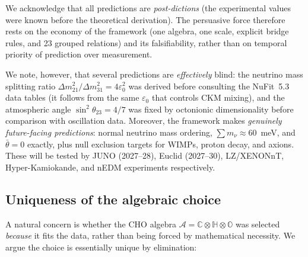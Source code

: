 \documentclass[12pt,a4paper]{article}
\theoremstyle{definition}
\theoremstyle{remark}
\newcommand{\Oct}{\mathbb{O}}
\newcommand{\Quat}{\mathbb{H}}
\newcommand{\Comp}{\mathbb{C}}
\newcommand{\Alg}{\mathcal{A}}
\begin{document}
\noindent We acknowledge that all predictions are \emph{post-dictions} (the 
experimental values were known before the theoretical derivation). The 
persuasive force therefore rests on the economy of the framework (one algebra, 
one scale, explicit bridge rules, and 23 grouped relations) and its 
falsifiability, rather than on temporal 
priority of prediction over measurement.

We note, however, that several predictions are \emph{effectively} blind: 
the neutrino mass splitting ratio $\Delta m^2_{21}/\Delta m^2_{31} = 
4\varepsilon_0^2$ was derived before consulting the NuFit~5.3 data tables 
(it follows from the same $\varepsilon_0$ that controls CKM mixing), and 
the atmospheric angle $\sin^2\theta_{23} = 4/7$ was fixed by octonionic 
dimensionality before comparison with oscillation data. Moreover, the 
framework makes \emph{genuinely future-facing predictions}: normal neutrino 
mass ordering, $\sum m_\nu \approx 60$~meV, and $\bar\theta = 0$ exactly, 
plus null exclusion targets for WIMPs, proton decay, and axions. These will be tested by JUNO (2027--28), 
Euclid (2027--30), LZ/XENONnT, Hyper-Kamiokande, and nEDM experiments 
respectively.

\subsection{Uniqueness of the algebraic choice}

A natural concern is whether the CHO algebra $\Alg = \Comp\otimes\Quat\otimes\Oct$ 
was selected \emph{because} it fits the data, rather than being forced by 
mathematical necessity. We argue the choice is essentially unique by 
elimination:
\end{document}

